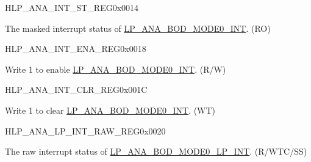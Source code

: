\begin{register}{H}{LP\_ANA\_INT\_ST\_REG}{0x0014}\label{regdesc:LPANAINTSTREG}
%
%
\regnewline%
\begin{regdesc}\begin{reglist}
\label{fielddesc:LPANABODMODE0INTST}\item [LP\_ANA\_BOD\_MODE0\_INT\_ST] The masked interrupt status of \hyperref[int:LPANABODMODE0INT]{LP\_ANA\_BOD\_MODE0\_INT}. (RO)
\end{reglist}\end{regdesc}
\end{register}

\begin{register}{H}{LP\_ANA\_INT\_ENA\_REG}{0x0018}\label{regdesc:LPANAINTENAREG}
%
%
\regnewline%
\begin{regdesc}\begin{reglist}
\label{fielddesc:LPANABODMODE0INTENA}\item [LP\_ANA\_BOD\_MODE0\_INT\_ENA] Write 1 to enable \hyperref[int:LPANABODMODE0INT]{LP\_ANA\_BOD\_MODE0\_INT}. (R/W)
\end{reglist}\end{regdesc}
\end{register}

\begin{register}{H}{LP\_ANA\_INT\_CLR\_REG}{0x001C}\label{regdesc:LPANAINTCLRREG}
%
%
\regnewline%
\begin{regdesc}\begin{reglist}
\label{fielddesc:LPANABODMODE0INTCLR}\item [LP\_ANA\_BOD\_MODE0\_INT\_CLR] Write 1 to clear \hyperref[int:LPANABODMODE0INT]{LP\_ANA\_BOD\_MODE0\_INT}. (WT)
\end{reglist}\end{regdesc}
\end{register}

\begin{register}{H}{LP\_ANA\_LP\_INT\_RAW\_REG}{0x0020}\label{regdesc:LPANALPINTRAWREG}
%
%
\regnewline%
\begin{regdesc}\begin{reglist}
\label{fielddesc:LPANABODMODE0LPINTRAW}\item [LP\_ANA\_BOD\_MODE0\_LP\_INT\_RAW] The raw interrupt status of \hyperref[int:LPANABODMODE0LPINT]{LP\_ANA\_BOD\_MODE0\_LP\_INT}. (R/WTC/SS)
\end{reglist}\end{regdesc}
\end{register}

